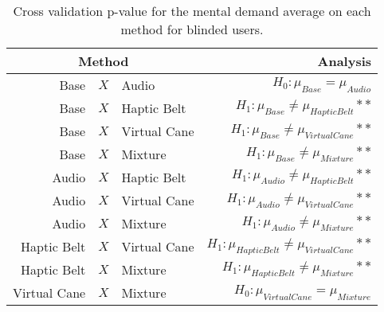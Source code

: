 
\begin{table}[!htb]
\centering
\caption{Cross validation p-value for the mental demand average on each method for blinded users.}
\label{tab:lsd_gsr_two_way}
\begin{tabular}{rclr}
\toprule
      \multicolumn{3}{c}{Method} &                                           Analysis \\
\midrule
              Base & $X$ & Audio &                   $H_0 : \mu_{Base} = \mu_{Audio}$ \\
        Base & $X$ & Haptic Belt &         $H_1 : \mu_{Base} \ne \mu_{Haptic Belt}**$ \\
       Base & $X$ & Virtual Cane &        $H_1 : \mu_{Base} \ne \mu_{Virtual Cane}**$ \\
            Base & $X$ & Mixture &             $H_1 : \mu_{Base} \ne \mu_{Mixture}**$ \\
       Audio & $X$ & Haptic Belt &        $H_1 : \mu_{Audio} \ne \mu_{Haptic Belt}**$ \\
      Audio & $X$ & Virtual Cane &       $H_1 : \mu_{Audio} \ne \mu_{Virtual Cane}**$ \\
           Audio & $X$ & Mixture &            $H_1 : \mu_{Audio} \ne \mu_{Mixture}**$ \\
Haptic Belt & $X$ & Virtual Cane & $H_1 : \mu_{Haptic Belt} \ne \mu_{Virtual Cane}**$ \\
     Haptic Belt & $X$ & Mixture &      $H_1 : \mu_{Haptic Belt} \ne \mu_{Mixture}**$ \\
    Virtual Cane & $X$ & Mixture &         $H_0 : \mu_{Virtual Cane} = \mu_{Mixture}$ \\
\bottomrule
\end{tabular}
\end{table}

